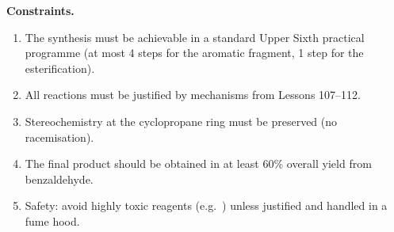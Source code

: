 \documentclass[11pt]{article}
\begin{document}
\textbf{Constraints.}
\begin{enumerate}
    \item The synthesis must be achievable in a standard Upper Sixth practical programme (at most 4 steps for the aromatic fragment, 1 step for the esterification).
    \item All reactions must be justified by mechanisms from Lessons 107--112.
    \item Stereochemistry at the cyclopropane ring must be preserved (no racemisation).
    \item The final product should be obtained in at least 60\% overall yield from benzaldehyde.
    \item Safety: avoid highly toxic reagents (e.g.\ ) unless justified and handled in a fume hood.
\end{enumerate}
\end{document}

